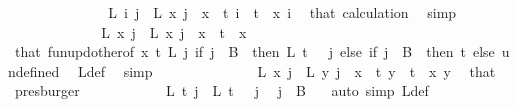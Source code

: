 \begin{isabellebody}
\ \ \ \ \ \ \ \ \ \ \isamarkupfalse%
\ \isamarkupfalse%
\ \ {\isachardoublequoteopen}L\ i\ j\ {\isacharequal}{\kern0pt}\ L\ x\ j{\isachardoublequoteclose}\ \ {\isachardoublequoteopen}x\ {\isacharless}{\kern0pt}\ t{\isachardoublequoteclose}\ {\isachardoublequoteopen}i\ {\isacharless}{\kern0pt}\ t{\isachardoublequoteclose}\ \ x\ i\ \isamarkupfalse%
\ that\ calculation\ \isamarkupfalse%
\ simp\isanewline
\isanewline
\ \ \ \ \ \ \ \ \ \ \isamarkupfalse%
\ \isamarkupfalse%
\ {\isachardoublequoteopen}L{\isacharprime}{\kern0pt}\ x\ j\ {\isacharequal}{\kern0pt}\ L\ x\ j{\isachardoublequoteclose}\ \ {\isachardoublequoteopen}x\ {\isacharless}{\kern0pt}\ t{\isachardoublequoteclose}\ \ x\ \isamarkupfalse%
\ that\ fun{\isacharunderscore}{\kern0pt}upd{\isacharunderscore}{\kern0pt}other{\isacharbrackleft}{\kern0pt}of\ x\ t\ L\ {\isachardoublequoteopen}{\isasymlambda}j{\isachardot}{\kern0pt}\ if\ j\ {\isasymin}\ B\ {}\ then\ L\ {\isacharparenleft}{\kern0pt}t\ {\isacharminus}{\kern0pt}\ {}{\isacharparenright}{\kern0pt}\ j\ else\ if\ j\ {\isasymin}\ B\ {}\ then\ t\ else\ undefined{\isachardoublequoteclose}{\isacharbrackright}{\kern0pt}\ \isamarkupfalse%
\ L{\isacharprime}{\kern0pt}{\isacharunderscore}{\kern0pt}def\ \isamarkupfalse%
\ simp\isanewline
\ \ \ \ \ \ \ \ \ \ \isamarkupfalse%
\ \isamarkupfalse%
\ {\isacharasterisk}{\kern0pt}{\isacharcolon}{\kern0pt}\ {\isachardoublequoteopen}L{\isacharprime}{\kern0pt}\ x\ j\ {\isacharequal}{\kern0pt}\ L{\isacharprime}{\kern0pt}\ y\ j{\isachardoublequoteclose}\ \ {\isachardoublequoteopen}x\ {\isacharless}{\kern0pt}\ t{\isachardoublequoteclose}\ {\isachardoublequoteopen}y\ {\isacharless}{\kern0pt}\ t{\isachardoublequoteclose}\ \ x\ y\ \isamarkupfalse%
\ that\ \isamarkupfalse%
\ presburger\isanewline
\isanewline
\ \ \ \ \ \ \ \ \ \ \isamarkupfalse%
\ {\isachardoublequoteopen}L{\isacharprime}{\kern0pt}\ t\ j\ {\isacharequal}{\kern0pt}\ L{\isacharprime}{\kern0pt}\ {\isacharparenleft}{\kern0pt}t\ {\isacharminus}{\kern0pt}\ {}{\isacharparenright}{\kern0pt}\ j{\isachardoublequoteclose}\ \isamarkupfalse%
\ {\isacartoucheopen}j\ {\isasymin}\ B\ {}{\isacartoucheclose}\ \isamarkupfalse%
\ {\isacharparenleft}{\kern0pt}auto\ simp{\isacharcolon}{\kern0pt}\ L{\isacharprime}{\kern0pt}{\isacharunderscore}{\kern0pt}def{\isacharparenright}{\kern0pt}\isanewline

\end{isabellebody}
